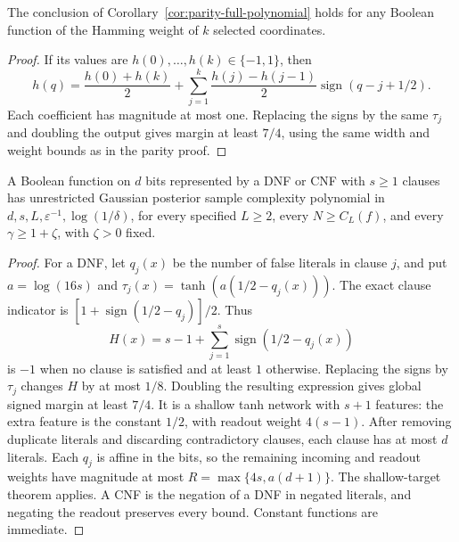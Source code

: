 \begin{corollary}
The conclusion of Corollary~\ref{cor:parity-full-polynomial} holds for
any Boolean function of the Hamming weight of $k$ selected coordinates.
\end{corollary}

\begin{proof}
If its values are $h(0),\ldots,h(k)\in\{-1,1\}$, then
\[
 h(q)=\frac{h(0)+h(k)}2+
       \sum_{j=1}^k\frac{h(j)-h(j-1)}2
                    \operatorname{sign}(q-j+1/2).
\]
Each coefficient has magnitude at most one. Replacing the signs by
the same $\tau_j$ and doubling the output gives margin at least $7/4$,
using the same width and weight bounds as in the parity proof.
\end{proof}


\begin{corollary}
A Boolean function on $d$ bits represented by a DNF or CNF with $s\ge1$
clauses has unrestricted Gaussian posterior sample complexity polynomial
in $d,s,L,\varepsilon^{-1},\log(1/\delta)$, for every specified $L\ge2$,
every $N\ge C_L(f)$, and every $\gamma\ge1+\zeta$, with $\zeta>0$ fixed.
\end{corollary}

\begin{proof}
For a DNF, let $q_j(x)$ be the number of false literals in clause $j$,
and put $a=\log(16s)$ and
$\tau_j(x)=\tanh(a(1/2-q_j(x)))$.
The exact clause indicator is
$[1+\operatorname{sign}(1/2-q_j)]/2$.
Thus
\[
 H(x)=s-1+\sum_{j=1}^s\operatorname{sign}(1/2-q_j(x))
\]
is $-1$ when no clause is satisfied and at least $1$ otherwise.
Replacing the signs by $\tau_j$ changes $H$ by at most $1/8$.
Doubling the resulting expression gives global signed margin at least
$7/4$. It is a shallow tanh network with $s+1$ features: the extra
feature is the constant $1/2$, with readout weight $4(s-1)$.
After removing duplicate literals and discarding contradictory clauses,
each clause has at most $d$ literals. Each $q_j$ is affine in the bits,
so the remaining incoming and readout weights have magnitude at most
$R=\max\{4s,a(d+1)\}$. The shallow-target theorem applies.
A CNF is the negation of a DNF in negated literals, and negating the
readout preserves every bound. Constant functions are immediate.
\end{proof}
